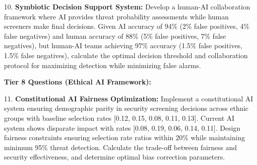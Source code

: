 \documentclass{article}
\begin{document}
10. \textbf{Symbiotic Decision Support System:} Develop a human-AI collaboration framework where AI provides threat probability assessments while human screeners make final decisions. Given AI accuracy of 94\% (2\% false positives, 4\% false negatives) and human accuracy of 88\% (5\% false positives, 7\% false negatives), but human-AI teams achieving 97\% accuracy (1.5\% false positives, 1.5\% false negatives), calculate the optimal decision threshold and collaboration protocol for maximizing detection while minimizing false alarms.

\textbf{Tier 8 Questions (Ethical AI Framework):}

11. \textbf{Constitutional AI Fairness Optimization:} Implement a constitutional AI system ensuring demographic parity in security screening decisions across ethnic groups with baseline selection rates [0.12, 0.15, 0.08, 0.11, 0.13]. Current AI system shows disparate impact with rates [0.08, 0.19, 0.06, 0.14, 0.11]. Design fairness constraints ensuring selection rate ratios within 20\% while maintaining minimum 95\% threat detection. Calculate the trade-off between fairness and security effectiveness, and determine optimal bias correction parameters.
\end{document}
